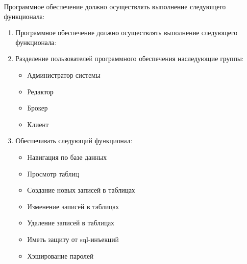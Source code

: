 \documentclass{mirea}
\begin{document}
	Программное обеспечение должно осуществлять выполнение следующего функционала:
	\begin{enumerate}
		\item[] Программное обеспечение должно осуществлять выполнение следующего функционала:
		\item Разделение пользователей программного обеспечения
		наследующие группы:
		\begin{itemize}
			\item Администратор системы
			\item Редактор
			\item Брокер
			\item Клиент
		\end{itemize}
		\item Обеспечивать следующий функционал:
		\begin{itemize}
			\item Навигация по базе данных
			\item Просмотр таблиц
			\item Создание новых записей в таблицах
			\item Изменение записей в таблицах
			\item Удаление записей в таблицах
			\item Иметь защиту от sql-инъекций
			\item Хэширование паролей
		\end{itemize}
	\end{enumerate}
\end{document}
